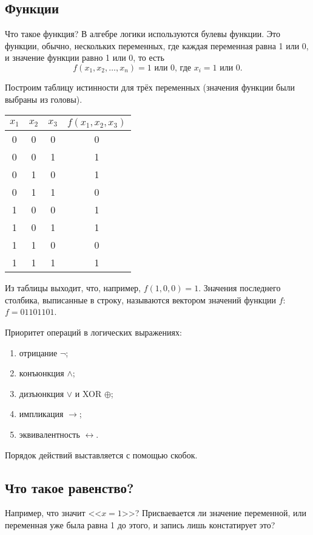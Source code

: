 \subsection{Функции}
Что такое функция? В алгебре логики используются булевы функции. Это функции, обычно, нескольких переменных, где каждая переменная равна 1 или 0, и значение функции равно 1 или 0, то есть
\begin{equation*}
    f(x_1, x_2, \ldots, x_n) = \text{1 или 0, где } x_i = \text{1 или 0}.
\end{equation*}

Построим таблицу истинности для трёх переменных (значения функции были выбраны из головы).
\begin{center}
    \begin{tabular}{c c c|c}
         $x_1$ & $x_2$ & $x_3$ & $f(x_1, x_2, x_3)$ \\
         \hline
         0 & 0 & 0 & 0\\
         0 & 0 & 1 & 1\\
         0 & 1 & 0 & 1\\
         0 & 1 & 1 & 0\\
         1 & 0 & 0 & 1\\
         1 & 0 & 1 & 1\\
         1 & 1 & 0 & 0\\
         1 & 1 & 1 & 1
    \end{tabular}
\end{center}

Из таблицы выходит, что, например, $f(1,0,0) = 1$. Значения последнего столбика, выписанные в строку, называются вектором значений функции $f$: $f = 01101101$.

Приоритет операций в логических выражениях:
\begin{enumerate}
    \item отрицание $\neg$;
    \item конъюнкция $\wedge$;
    \item дизъюнкция $\vee$ и XOR $\oplus$;
    \item импликация $\to$;
    \item эквивалентность $\leftrightarrow$.
\end{enumerate}
Порядок действий выставляется с помощью скобок.
\subsection{Что такое равенство?}
Например, что значит <<$x = 1$>>? Присваевается ли значение переменной, или переменная уже была равна 1 до этого, и запись лишь констатирует это?

